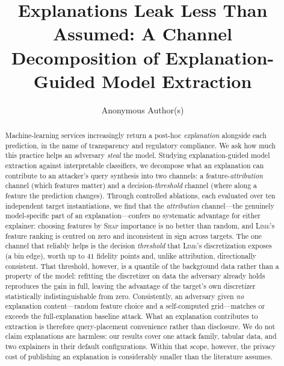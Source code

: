 \documentclass[sigconf,anonymous,review]{acmart}
\begin{document}
\title[Explanations Leak Less Than Assumed]{Explanations Leak Less Than Assumed:
A Channel Decomposition of Explanation-Guided Model Extraction}

\author{Anonymous Author(s)}
\email{}
\renewcommand{\shortauthors}{Anonymous}

\begin{abstract}
Machine-learning services increasingly return a post-hoc \emph{explanation} alongside
each prediction, in the name of transparency and regulatory compliance. We ask how much
this practice helps an adversary \emph{steal} the model. Studying explanation-guided
model extraction against interpretable classifiers, we decompose what an explanation can
contribute to an attacker's query synthesis into two channels: a feature-\emph{attribution}
channel (which features matter) and a decision-\emph{threshold} channel (where along a
feature the prediction changes). Through controlled ablations, each evaluated over ten independent target instantiations, we find that
the \emph{attribution} channel---the genuinely model-specific part of an explanation---confers no
systematic advantage for either explainer: choosing features by \textsc{Shap} importance is no better
than random, and \textsc{Lime}'s feature ranking is centred on zero and inconsistent in sign across
targets. The one channel that reliably helps is the decision \emph{threshold} that \textsc{Lime}'s
discretization exposes (a bin edge), worth up to $41$ fidelity points and, unlike attribution,
directionally consistent. That threshold, however, is a quantile of the background data rather than a
property of the model: refitting the discretizer on data the adversary already holds reproduces the
gain in full, leaving the advantage of the target's own discretizer statistically indistinguishable
from zero. Consistently, an adversary given \emph{no} explanation content---random feature choice and
a self-computed grid---matches or exceeds the full-explanation baseline attack. What an explanation
contributes to extraction is therefore query-placement convenience rather than disclosure. We do not
claim explanations are harmless: our results cover one attack family, tabular data, and two explainers
in their default configurations. Within that scope, however, the privacy cost of publishing an
explanation is considerably smaller than the literature assumes.
\end{abstract}
\end{document}
